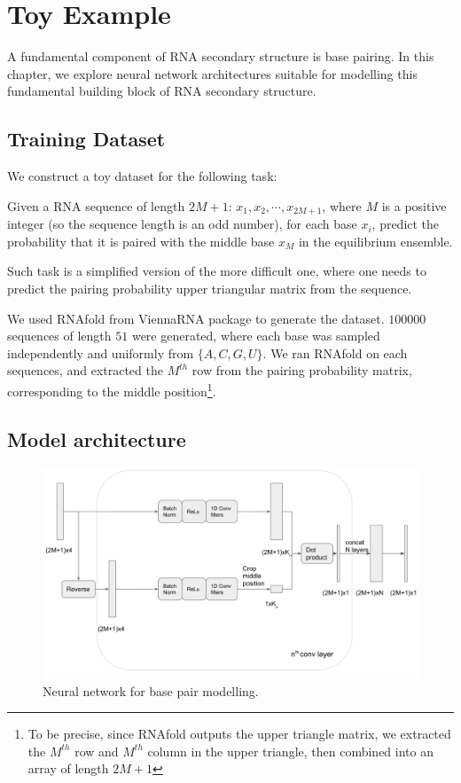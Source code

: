 \documentclass{proposal}
\begin{document}
\chapter{Toy Example} \label{chap:toy_example}

A fundamental component of RNA secondary structure is base pairing.
In this chapter, we explore neural network architectures suitable for modelling this fundamental
building block of RNA secondary structure.

\section{Training Dataset}

We construct a toy dataset for the following task:

Given a RNA sequence of length $2M + 1$: $x_1, x_2, \cdots, x_{2M+1}$,
where $M$ is a positive integer (so the sequence length is an odd number),
for each base $x_i$, predict the probability that it is
paired with the middle base $x_M$ in the equilibrium ensemble.

Such task is a simplified version of the more difficult one,
where one needs to predict the pairing probability upper triangular matrix from the sequence.

We used RNAfold from ViennaRNA package\cite{lorenz2011viennarna} to generate the dataset.
$100000$ sequences of length $51$ were generated,
where each base was sampled independently and uniformly from $\{A, C, G, U\}$.
We ran RNAfold on each sequences, and extracted the $M^{th}$ row from the pairing probability
matrix, corresponding to the middle
position\footnote{To be precise, since RNAfold outputs the upper triangle matrix,
we extracted the $M^{th}$ row and $M^{th}$ column in the upper triangle, then combined into an array of length $2M+1$}.

\section{Model architecture}

\begin{figure}
    \centering
    \includegraphics[width=\textwidth]{plot/pair_prob_nn_plot.png}
    \caption{Neural network for base pair modelling.}
    \label{fig:base_pair_nn}
    \centering
\end{figure}
\end{document}
